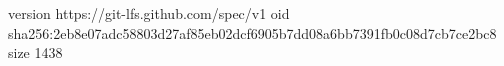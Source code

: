 version https://git-lfs.github.com/spec/v1
oid sha256:2eb8e07adc58803d27af85eb02dcf6905b7dd08a6bb7391fb0c08d7cb7ce2bc8
size 1438
